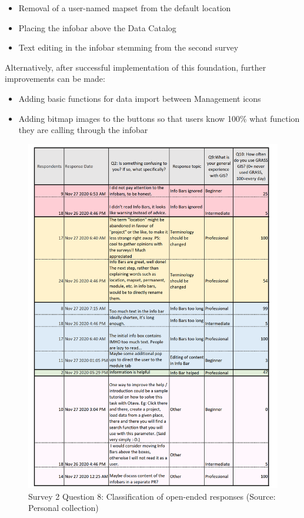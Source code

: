\documentclass[a4paper,10pt,twoside]{article}
\begin{document}
\begin{itemize}
\item Removal of a user-named mapset from the default location
\item Placing the infobar above the Data Catalog
\item Text editing in the infobar stemming from the second survey
\end {itemize}

\noindent Alternatively, after successful implementation of this foundation, further improvements can be made:

\begin {itemize}
\item Adding basic functions for data import between Management icons
\item Adding bitmap images to the buttons so that users know 100\% what function they are calling through the infobar
\end {itemize}

\newpage
\begin{figure}[hbt!] 
\begin{center}
\includegraphics[width=15cm]{../surveys/analyzed_data/survey2_question8.png} 
\caption[Survey 2 Question 8: Classification of open-ended responses]{Survey 2 Question 8: Classification of open-ended responses (Source: Personal collection)}
\label{fig:survey2_question8}
\end{center}
\end{figure}
\end{document}
